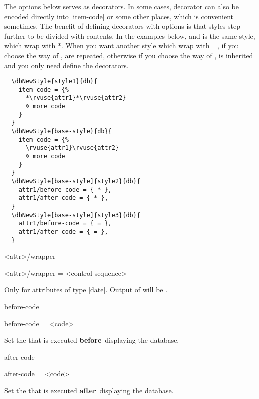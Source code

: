 \documentclass[full]{l3doc}
\def\enbefore{\textbf{before}~}
\def\enafter{\textbf{after}~}
\begin{document}
\begin{documentation}
The options below serves as decorators. In some cases, decorator can also be
encoded directly into |item-code| or some other places, which is convenient
sometimes. The benefit of defining decorators with options is that styles step
further to be divided with contents. In the examples below,  and
 is the same style, which wrap  with *. When you want
another style which wrap  with =, if you choose the way of
,  are repeated, otherwise if you choose the way
of ,  is inherited and you only need define the
decorators.

\begin{verbatim}
  \dbNewStyle{style1}{db}{
    item-code = {%
      *\rvuse{attr1}*\rvuse{attr2}
      % more code
    }
  }
  \dbNewStyle{base-style}{db}{
    item-code = {%
      \rvuse{attr1}\rvuse{attr2}
      % more code
    }
  }
  \dbNewStyle[base-style]{style2}{db}{
    attr1/before-code = { * },
    attr1/after-code = { * },
  }
  \dbNewStyle[base-style]{style3}{db}{
    attr1/before-code = { = },
    attr1/after-code = { = },
  }
\end{verbatim}

\begin{option}[added=2022-01-08, rEXP]{<attr>/wrapper}
  \begin{syntax}
    <attr>/wrapper = <control sequence>
  \end{syntax}

  Only for attributes of type |date|. Output of 
  will be .
\end{option}

\begin{option}[added=2022-01-05, rEXP]{before-code}
  \begin{syntax}
    before-code = <code>
  \end{syntax}

  Set the  that is executed \enbefore displaying the database.
\end{option}

\begin{option}[added=2022-01-05, rEXP]{after-code}
  \begin{syntax}
    after-code = <code>
  \end{syntax}

  Set the  that is executed \enafter displaying the database.
\end{option}


\end{documentation}
\end{document}
